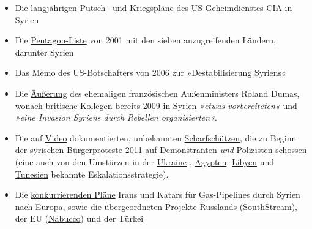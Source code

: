 \begin{itemize}
\tightlist
\item
  Die langjährigen
  \href{http://www.globalresearch.ca/the-u-s-carried-out-regime-change-in-syria-in-1949-and-tried-again-in-1957-1986-1991-and-2011-today/5576700}{Putsch}--
  und
  \href{http://www.globalresearch.ca/1983-cia-document-reveals-plan-to-destroy-syria-foreshadows-current-crisis/5577785}{Kriegspläne}
  des US-Geheimdienstes CIA in Syrien
\item
  Die
  \href{http://www.globalresearch.ca/we-re-going-to-take-out-7-countries-in-5-years-iraq-syria-lebanon-libya-somalia-sudan-iran/5166}{Pentagon-Liste}
  von 2001 mit den sieben anzugreifenden Ländern, darunter Syrien
\item
  Das
  \href{http://www.globalresearch.ca/decoding-the-current-war-in-syria-the-wikileaks-files/5473909}{Memo}
  des US-Botschafters von 2006 zur »Destabilisierung Syriens«
\item
  Die
  \href{http://www.globalresearch.ca/former-french-foreign-minister-the-war-against-syria-was-planned-two-years-before-the-arab-spring/5339112}{Äußerung}
  des ehemaligen französischen Außenministers Roland Dumas, wonach
  britische Kollegen bereits 2009 in Syrien \emph{»etwas vorbereiteten«}
  und \emph{»eine Invasion Syriens durch Rebellen organisierten«}.
\item
  Die auf \href{https://www.youtube.com/watch?v=aiMwqm2H8TU}{Video}
  dokumentierten, unbekannten
  \href{http://www.globalresearch.ca/daraa-2011-syrias-islamist-insurrection-in-disguise/5460547}{Scharfschützen},
  die zu Beginn der syrischen Bürgerproteste 2011 auf Demonstranten
  \emph{und} Polizisten schossen (eine auch von den Umstürzen in der
  \href{https://www.heise.de/tp/features/Woher-kamen-die-Todesschuesse-3630949.html}{Ukraine}
  ,
  \href{http://www.globalresearch.ca/unknown-snipers-and-western-backed-regime-change/27904}{Ägypten},
  \href{http://www.globalresearch.ca/unknown-snipers-and-western-backed-regime-change/27904}{Libyen}
  und
  \href{https://www.freitag.de/autoren/gela/ben-ali-was-2011-wirklich-geschah}{Tunesien}
  bekannte Eskalationsstrategie).
\item
  Die
  \href{http://www.ecowatch.com/syria-another-pipeline-war-1882180532.html}{konkurrierenden
  Pläne} Irans und Katars für Gas-Pipelines durch Syrien nach Europa,
  sowie die übergeordneten Projekte Russlands
  (\href{https://en.wikipedia.org/wiki/South_Stream}{SouthStream}), der
  EU (\href{https://de.wikipedia.org/wiki/Nabucco-Pipeline}{Nabucco})
  und der Türkei

\end{itemize}
